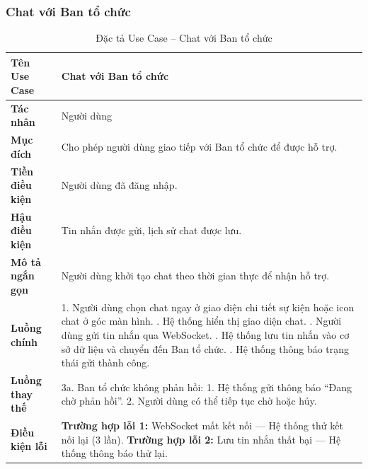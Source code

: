 \subsubsection{Chat với Ban tổ chức}
\begin{table}[H]
\centering
\renewcommand{\arraystretch}{1.3}
\setlength{\tabcolsep}{8pt}
\begin{tabularx}{\textwidth}{|l|X|}
\hline
\textbf{Tên Use Case} & Chat với Ban tổ chức \\ \hline
\textbf{Tác nhân} & Người dùng \\ \hline
\textbf{Mục đích} & Cho phép người dùng giao tiếp với Ban tổ chức để được hỗ trợ. \\ \hline
\textbf{Tiền điều kiện} & Người dùng đã đăng nhập. \\ \hline
\textbf{Hậu điều kiện} & Tin nhắn được gửi, lịch sử chat được lưu. \\ \hline
\textbf{Mô tả ngắn gọn} & Người dùng khởi tạo chat theo thời gian thực để nhận hỗ trợ. \\ \hline
\textbf{Luồng chính} &
1. Người dùng chọn chat ngay ở giao diện chi tiết sự kiện hoặc icon chat ở góc màn hình. \newline
2. Hệ thống hiển thị giao diện chat. \newline
3. Người dùng gửi tin nhắn qua WebSocket. \newline
4. Hệ thống lưu tin nhắn vào cơ sở dữ liệu và chuyển đến Ban tổ chức. \newline
5. Hệ thống thông báo trạng thái gửi thành công. \\ \hline
\textbf{Luồng thay thế} &
3a. Ban tổ chức không phản hồi: \newline
\hspace*{1em}1. Hệ thống gửi thông báo “Đang chờ phản hồi”. \newline
\hspace*{1em}2. Người dùng có thể tiếp tục chờ hoặc hủy. \\ \hline
\textbf{Điều kiện lỗi} &
\textbf{Trường hợp lỗi 1:} WebSocket mất kết nối — Hệ thống thử kết nối lại (3 lần). \newline
\textbf{Trường hợp lỗi 2:} Lưu tin nhắn thất bại — Hệ thống thông báo thử lại. \\ \hline
\end{tabularx}
\vspace{15pt}
\caption{Đặc tả Use Case -- Chat với Ban tổ chức}
\label{tab:uc_chat_org}
\end{table}



